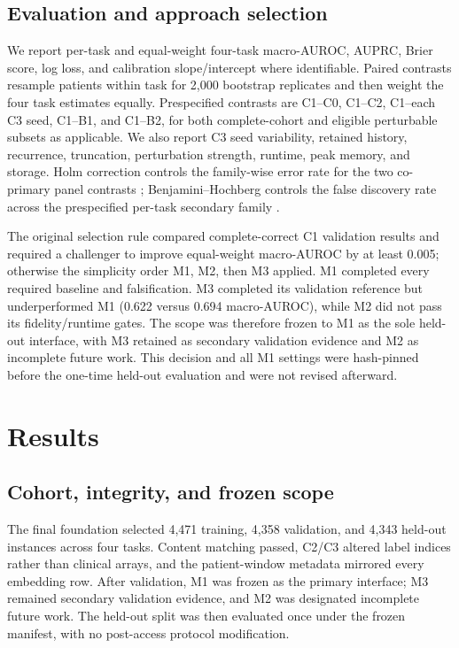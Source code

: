 \documentclass[pmlr,twocolumn,10pt]{jmlr}
\begin{document}
\subsection{Evaluation and approach selection}

We report per-task and equal-weight four-task macro-AUROC, AUPRC, Brier score,
log loss, and calibration slope/intercept where identifiable. Paired contrasts
resample patients within task for 2,000 bootstrap replicates and then weight the
four task estimates equally. Prespecified contrasts are C1--C0, C1--C2,
C1--each C3 seed, C1--B1, and C1--B2, for both complete-cohort and eligible
perturbable subsets as applicable. We also report C3 seed variability, retained
history, recurrence, truncation, perturbation strength, runtime, peak memory,
and storage. Holm correction controls the family-wise error rate for the two
co-primary panel contrasts \citep{holm1979multiple}; Benjamini--Hochberg controls
the false discovery rate across the prespecified per-task secondary family
\citep{benjamini1995fdr}.

The original selection rule compared complete-correct C1 validation results and
required a challenger to improve equal-weight macro-AUROC by at least 0.005;
otherwise the simplicity order M1, M2, then M3 applied. M1 completed every
required baseline and falsification. M3 completed its validation reference but
underperformed M1 (0.622 versus 0.694 macro-AUROC), while M2 did not pass its
fidelity/runtime gates. The scope was therefore frozen to M1 as the sole
held-out interface, with M3 retained as secondary validation evidence and M2 as
incomplete future work. This decision and all M1 settings were hash-pinned
before the one-time held-out evaluation and were not revised afterward.

\section{Results}
\label{sec:results}

\subsection{Cohort, integrity, and frozen scope}

The final foundation selected 4,471 training, 4,358 validation, and 4,343
held-out instances across four tasks. Content matching passed, C2/C3 altered
label indices rather than clinical arrays, and the patient-window metadata
mirrored every embedding row. After validation, M1 was frozen as the primary
interface; M3 remained secondary validation evidence, and M2 was designated
incomplete future work. The held-out split was then evaluated once under the
frozen manifest, with no post-access protocol modification.
\end{document}
